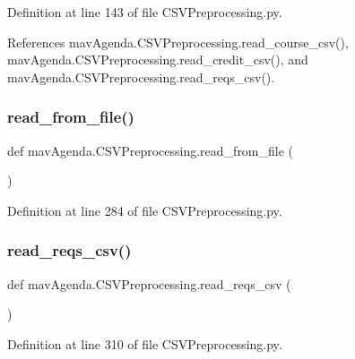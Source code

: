 Definition at line 143 of file C\+S\+V\+Preprocessing.\+py.



References mav\+Agenda.\+C\+S\+V\+Preprocessing.\+read\+\_\+course\+\_\+csv(), mav\+Agenda.\+C\+S\+V\+Preprocessing.\+read\+\_\+credit\+\_\+csv(), and mav\+Agenda.\+C\+S\+V\+Preprocessing.\+read\+\_\+reqs\+\_\+csv().

\mbox{\label{namespacemavAgenda_1_1CSVPreprocessing_abbb7d5587b5823e95cb282ce49899bdd}} 
\subsubsection{\texorpdfstring{read\+\_\+from\+\_\+file()}{read\_from\_file()}}
{\footnotesize\ttfamily def mav\+Agenda.\+C\+S\+V\+Preprocessing.\+read\+\_\+from\+\_\+file (\begin{DoxyParamCaption}{ }\end{DoxyParamCaption})}



Definition at line 284 of file C\+S\+V\+Preprocessing.\+py.

\mbox{\label{namespacemavAgenda_1_1CSVPreprocessing_a6b9b66f70f008c5046d3ad8264f50ab5}} 
\subsubsection{\texorpdfstring{read\+\_\+reqs\+\_\+csv()}{read\_reqs\_csv()}}
{\footnotesize\ttfamily def mav\+Agenda.\+C\+S\+V\+Preprocessing.\+read\+\_\+reqs\+\_\+csv (\begin{DoxyParamCaption}{ }\end{DoxyParamCaption})}



Definition at line 310 of file C\+S\+V\+Preprocessing.\+py.



